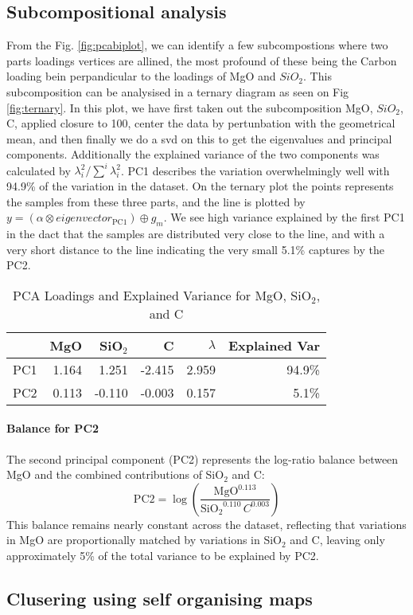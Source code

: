 
\subsection{Subcompositional analysis }

From the Fig. \ref{fig:pcabiplot}, we can identify a few subcompostions where two parts loadings vertices 
are allined, the most profound of these being the Carbon loading bein perpandicular to the loadings of MgO and $SiO_2$. This subcomposition can be analysised in a ternary diagram as seen on Fig \ref{fig:ternary}. In this plot, we have first taken out the subcomposition MgO, $SiO_2$, C, applied closure to 100, center the data by pertunbation with the geometrical mean, and then finally we do a svd on this to get the eigenvalues and principal components. Additionally the explained variance of the two components was calculated by $\lambda_{i}^{2} / \sum^{i} \lambda_{i}^{2}$. PC1 describes the variation overwhelmingly well with 94.9\% of the variation in the dataset. On the ternary plot the points represents the samples from these three parts, and the line is plotted by $y = (\alpha \otimes eigenvector_{\mathrm{PC1}}) \oplus g_m$. We see high variance explained by the first PC1 in the dact that the samples are distributed very close to the line, and with a very short distance to the line indicating the very small 5.1\% captures by the PC2. 

\begin{table}[h!]
\centering
\begin{tabular}{lrrrrr}
\hline
      & MgO      & SiO$_2$   & C         & $\lambda$   & Explained Var \\
\hline
PC1   & 1.164    & 1.251     & -2.415    & 2.959       & 94.9\% \\
PC2   & 0.113    & -0.110    & -0.003    & 0.157       & 5.1\% \\
\hline
\end{tabular}
\caption{PCA Loadings and Explained Variance for MgO, SiO$_2$, and C}
\label{tab:pca_loadings}
\end{table}

\paragraph{Balance for PC2}  
The second principal component (PC2) represents the log-ratio balance between MgO and the combined contributions of SiO$_2$ and C:
\[
\mathrm{PC2} = \log\left( \frac{\mathrm{MgO}^{0.113}}{\mathrm{SiO_2}^{0.110} \, C^{0.003}} \right)
\]
This balance remains nearly constant across the dataset, reflecting that variations in MgO are proportionally matched by variations in SiO$_2$ and C, leaving only approximately 5\% of the total variance to be explained by PC2. 





\subsection{Clusering using self organising maps}









